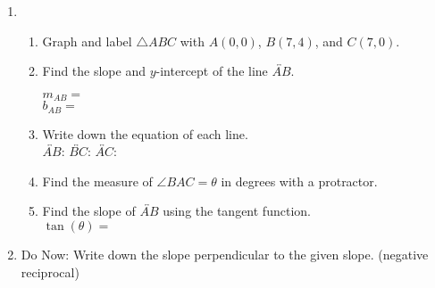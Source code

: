 \begin{enumerate}
    \item \begin{enumerate}
      \item Graph and label $\triangle ABC$ with $A(0,0)$, $B(7,4)$, and $C(7,0)$.
      \begin{center}
      \end{center}
      \item Find the slope and $y$-intercept of the line $\overleftrightarrow{AB}$.
        \begin{multicols}{2}
          $m_{AB}=$ \\
          $b_{AB}=$
        \end{multicols} \vspace{0.5cm}
      \item Write down the equation of each line. \\[0.5cm]
        $\overleftrightarrow{AB}$: \hfill
        $\overleftrightarrow{BC}$: \hfill
        $\overleftrightarrow{AC}$: \hspace{2cm}
      \vspace{2cm}
      \item Find the measure of $\angle BAC=\theta$ in degrees with a protractor. \vspace{0.5cm}
      \item Find the slope of $\overleftrightarrow{AB}$ using the tangent function.\\[0.5cm]
      $\displaystyle \tan(\theta)=$
      \vspace{2cm}
    \end{enumerate}

\newpage
\item Do Now: Write down the slope perpendicular to the given slope. (negative reciprocal) \vspace{0.5cm}
\begin{enumerate}
\end{enumerate}


\end{enumerate}
